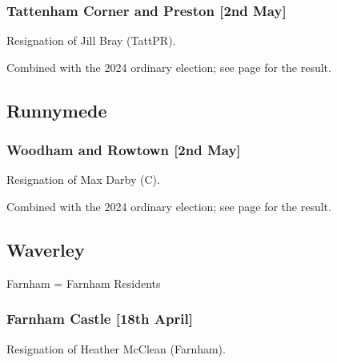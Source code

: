 \documentclass[a4paper,openany]{book}
\begin{document}
\begin{resultsiii}
\subsubsection*{Tattenham Corner and Preston \hspace*{\fill}\nolinebreak[1]%
	\enspace\hspace*{\fill}
	[2nd May]}


Resignation of Jill Bray (TattPR).

Combined with the 2024 ordinary election; see page \pageref{ReigateBansteadTattenhamCornerPreston} for the result.

\subsection*{Runnymede}

\subsubsection*{Woodham and Rowtown \hspace*{\fill}\nolinebreak[1]%
	\enspace\hspace*{\fill}
	[2nd May]}


Resignation of Max Darby (C).

Combined with the 2024 ordinary election; see page \pageref{RunnymedeWoodhamRowtown} for the result.

\subsection*{Waverley}

Farnham = Farnham Residents

\subsubsection*{Farnham Castle \hspace*{\fill}\nolinebreak[1]%
	\enspace\hspace*{\fill}
	[18th April]}


Resignation of Heather McClean (Farnham).


\end{resultsiii}
\end{document}
